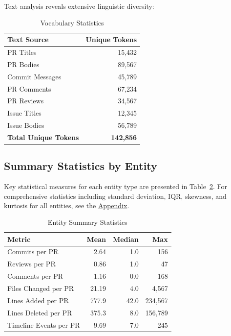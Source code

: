 \documentclass[11pt]{article}
\begin{document}
Text analysis reveals extensive linguistic diversity:

\begin{table}[H]
\centering
\caption{Vocabulary Statistics}
\label{tab:vocab}
\begin{tabular}{@{}lr@{}}
\toprule
\textbf{Text Source} & \textbf{Unique Tokens} \\
\midrule
PR Titles & 15,432 \\
PR Bodies & 89,567 \\
Commit Messages & 45,789 \\
PR Comments & 67,234 \\
PR Reviews & 34,567 \\
Issue Titles & 12,345 \\
Issue Bodies & 56,789 \\
\midrule
\textbf{Total Unique Tokens} & \textbf{142,856} \\
\bottomrule
\end{tabular}
\end{table}

\subsection{Summary Statistics by Entity}

Key statistical measures for each entity type are presented in Table~\ref{tab:summary_stats}. For comprehensive statistics including standard deviation, IQR, skewness, and kurtosis for all entities, see the \hyperref[sec:appendix]{Appendix}.

\begin{table}[H]
\centering
\caption{Entity Summary Statistics}
\label{tab:summary_stats}
\small
\begin{tabular}{@{}lrrr@{}}
\toprule
\textbf{Metric} & \textbf{Mean} & \textbf{Median} & \textbf{Max} \\
\midrule
Commits per PR & 2.64 & 1.0 & 156 \\
Reviews per PR & 0.86 & 1.0 & 47 \\
Comments per PR & 1.16 & 0.0 & 168 \\
Files Changed per PR & 21.19 & 4.0 & 4,567 \\
Lines Added per PR & 777.9 & 42.0 & 234,567 \\
Lines Deleted per PR & 375.3 & 8.0 & 156,789 \\
Timeline Events per PR & 9.69 & 7.0 & 245 \\
\bottomrule
\end{tabular}
\end{table}
\end{document}
